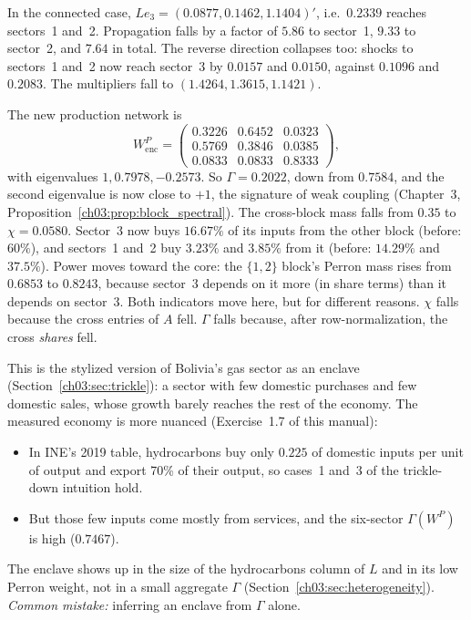 \documentclass[../solutions_manual.tex]{subfiles}
\begin{document}
 In the connected case, $Le_3 = (0.0877, 0.1462, 1.1404)'$, i.e.\ $0.2339$ reaches sectors~1 and~2. Propagation falls by a factor of $5.86$ to sector~1, $9.33$ to sector~2, and $7.64$ in total. The reverse direction collapses too: shocks to sectors~1 and~2 now reach sector~3 by $0.0157$ and $0.0150$, against $0.1096$ and $0.2083$. The multipliers fall to $(1.4264, 1.3615, 1.1421)$.

 The new production network is
\[
W^P_{\text{enc}} = \begin{pmatrix} 0.3226 & 0.6452 & 0.0323\\ 0.5769 & 0.3846 & 0.0385\\ 0.0833 & 0.0833 & 0.8333\end{pmatrix},
\]
with eigenvalues $1, 0.7978, -0.2573$. So $\Gamma = 0.2022$, down from $0.7584$, and the second eigenvalue is now close to $+1$, the signature of weak coupling (Chapter~3, Proposition~\ref{ch03:prop:block_spectral}). The cross-block mass falls from $0.35$ to $\chi = 0.0580$. Sector~3 now buys $16.67\%$ of its inputs from the other block (before: $60\%$), and sectors~1 and~2 buy $3.23\%$ and $3.85\%$ from it (before: $14.29\%$ and $37.5\%$). Power moves toward the core: the $\{1,2\}$ block's Perron mass rises from $0.6853$ to $0.8243$, because sector~3 depends on it more (in share terms) than it depends on sector~3. Both indicators move here, but for different reasons. $\chi$ falls because the cross entries of $A$ fell. $\Gamma$ falls because, after row-normalization, the cross \emph{shares} fell.

 This is the stylized version of Bolivia's gas sector as an enclave (Section~\ref{ch03:sec:trickle}): a sector with few domestic purchases and few domestic sales, whose growth barely reaches the rest of the economy. The measured economy is more nuanced (Exercise~1.7 of this manual):
\begin{itemize}
\item In INE's 2019 table, hydrocarbons buy only $0.225$ of domestic inputs per unit of output and export 70\% of their output, so cases~1 and~3 of the trickle-down intuition hold.
\item But those few inputs come mostly from services, and the six-sector $\Gamma(W^P)$ is high ($0.7467$).
\end{itemize}
The enclave shows up in the size of the hydrocarbons column of $L$ and in its low Perron weight, not in a small aggregate $\Gamma$ (Section~\ref{ch03:sec:heterogeneity}). \emph{Common mistake:} inferring an enclave from $\Gamma$ alone.
\end{document}
